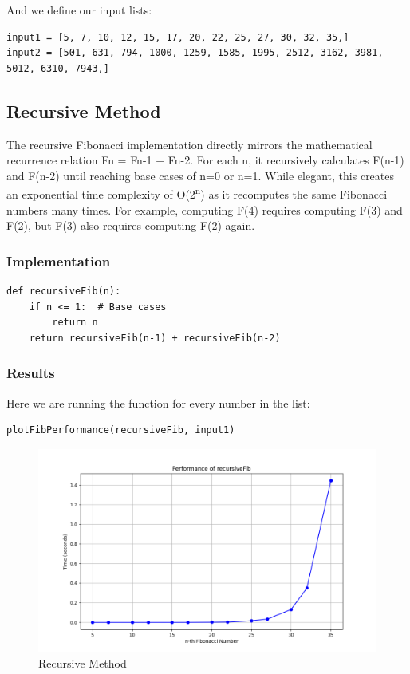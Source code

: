 \documentclass[a4paper, 12pt]{article}
\begin{document}
And we define our input lists:
\begin{verbatim}
input1 = [5, 7, 10, 12, 15, 17, 20, 22, 25, 27, 30, 32, 35,]
input2 = [501, 631, 794, 1000, 1259, 1585, 1995, 2512, 3162, 3981, 5012, 6310, 7943,]
\end{verbatim}
\subsection{Recursive Method}
\label{sec:orgdd16fab}
The recursive Fibonacci implementation directly mirrors the mathematical recurrence relation Fn = Fn-1 + Fn-2. For each n, it recursively calculates F(n-1) and F(n-2) until reaching base cases of n=0 or n=1. While elegant, this creates an exponential time complexity of O(2\textsuperscript{n}) as it recomputes the same Fibonacci numbers many times. For example, computing F(4) requires computing F(3) and F(2), but F(3) also requires computing F(2) again.
\subsubsection{Implementation}
\label{sec:org88fddfb}
\begin{verbatim}
def recursiveFib(n):
    if n <= 1:  # Base cases
        return n
    return recursiveFib(n-1) + recursiveFib(n-2)
\end{verbatim}
\subsubsection{Results}
\label{sec:orgd1d0c06}
Here we are running the function for every number in the list:
\begin{verbatim}
plotFibPerformance(recursiveFib, input1)
\end{verbatim}
\begin{figure}[htbp]  %
  \centering  %
  \includegraphics[width=\textwidth]{./recursiveFib.png}  %
  \caption{Recursive Method}  %
  \label{fig:yourlabel}  %
\end{figure}
\end{document}
